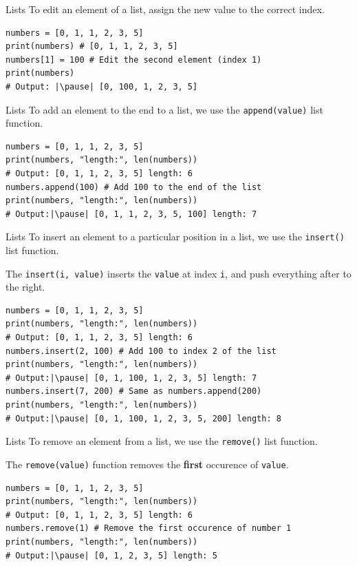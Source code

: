 \documentclass[dvipsnames, svgnames, x11names, handout]{beamer}
\begin{document}
\begin{frame}[fragile]{Lists}
To edit an element of a list, assign the new value to the correct index. \pause
\begin{verbatim}
numbers = [0, 1, 1, 2, 3, 5]
print(numbers) # [0, 1, 1, 2, 3, 5]
numbers[1] = 100 # Edit the second element (index 1)
print(numbers)  
# Output: |\pause| [0, 100, 1, 2, 3, 5]
\end{verbatim}
\end{frame}

\begin{frame}[fragile]{Lists}
To add an element to the end to a list, we use the \texttt{append(value)} list function. \pause
\begin{verbatim}
numbers = [0, 1, 1, 2, 3, 5]
print(numbers, "length:", len(numbers)) 
# Output: [0, 1, 1, 2, 3, 5] length: 6
numbers.append(100) # Add 100 to the end of the list
print(numbers, "length:", len(numbers))
# Output:|\pause| [0, 1, 1, 2, 3, 5, 100] length: 7
\end{verbatim}
\end{frame}

\begin{frame}[fragile]{Lists}
To insert an element to a particular position in a list, we use the \texttt{insert()} list function.

The \texttt{insert(i, value)} inserts the \texttt{value} at index \texttt{i}, and push everything after to the right. \pause
\begin{verbatim}
numbers = [0, 1, 1, 2, 3, 5]
print(numbers, "length:", len(numbers)) 
# Output: [0, 1, 1, 2, 3, 5] length: 6
numbers.insert(2, 100) # Add 100 to index 2 of the list
print(numbers, "length:", len(numbers))  
# Output:|\pause| [0, 1, 100, 1, 2, 3, 5] length: 7
numbers.insert(7, 200) # Same as numbers.append(200)
print(numbers, "length:", len(numbers))  
# Output:|\pause| [0, 1, 100, 1, 2, 3, 5, 200] length: 8
\end{verbatim}
\end{frame}

\begin{frame}[fragile]{Lists}
To remove an element from a list, we use the \texttt{remove()} list function.

The \texttt{remove(value)} function removes the \textbf{first} occurence of \texttt{value}. \pause
\begin{verbatim}
numbers = [0, 1, 1, 2, 3, 5]
print(numbers, "length:", len(numbers)) 
# Output: [0, 1, 1, 2, 3, 5] length: 6
numbers.remove(1) # Remove the first occurence of number 1
print(numbers, "length:", len(numbers))
# Output:|\pause| [0, 1, 2, 3, 5] length: 5
\end{verbatim}
\end{frame}
\end{document}
